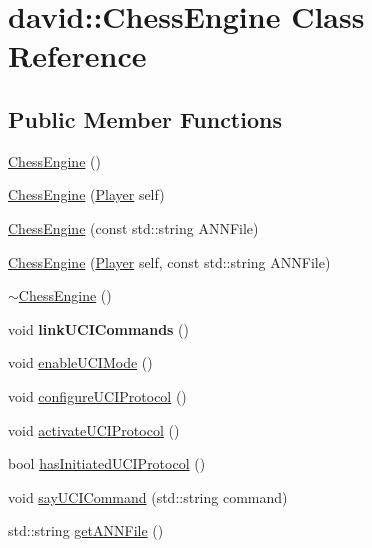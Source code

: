 \hypertarget{classdavid_1_1ChessEngine}{}\section{david\+:\+:Chess\+Engine Class Reference}
\label{classdavid_1_1ChessEngine}
\subsection*{Public Member Functions}
\begin{DoxyCompactItemize}
\item 
\hyperlink{classdavid_1_1ChessEngine_a8207c17987e0e3fca64a71288a3fabfc}{Chess\+Engine} ()
\item 
\hyperlink{classdavid_1_1ChessEngine_a93e1910ba6f2ea91a64027ae404ea47c}{Chess\+Engine} (\hyperlink{structdavid_1_1Player}{Player} self)
\item 
\hyperlink{classdavid_1_1ChessEngine_a850f69799f447605f730eb6edff09a1e}{Chess\+Engine} (const std\+::string A\+N\+N\+File)
\item 
\hyperlink{classdavid_1_1ChessEngine_a17a031eb5b738d0d030addc399eee1be}{Chess\+Engine} (\hyperlink{structdavid_1_1Player}{Player} self, const std\+::string A\+N\+N\+File)
\item 
\hyperlink{classdavid_1_1ChessEngine_a48df80ac4ae29baa7f8bfd50429d4711}{$\sim$\+Chess\+Engine} ()
\item 
\mbox{\label{classdavid_1_1ChessEngine_af0c14184c87a7859e6ebe24d3d635f71}} 
void {\bfseries link\+U\+C\+I\+Commands} ()
\item 
void \hyperlink{classdavid_1_1ChessEngine_a87d97f18682651d669bd978e45c40add}{enable\+U\+C\+I\+Mode} ()
\item 
void \hyperlink{classdavid_1_1ChessEngine_acb677e30d52e8a66f96eaa6954418a9e}{configure\+U\+C\+I\+Protocol} ()
\item 
void \hyperlink{classdavid_1_1ChessEngine_acc39e613bf801c1ac1dfb8e0eee3d025}{activate\+U\+C\+I\+Protocol} ()
\item 
bool \hyperlink{classdavid_1_1ChessEngine_a0783753d3e0678d053d28d509b4170cb}{has\+Initiated\+U\+C\+I\+Protocol} ()
\item 
void \hyperlink{classdavid_1_1ChessEngine_acd362bad7fd99d2210ea2ee9fa92db1a}{say\+U\+C\+I\+Command} (std\+::string command)
\item 
std\+::string \hyperlink{classdavid_1_1ChessEngine_a364e98f32632c0669585ab464f8b6532}{get\+A\+N\+N\+File} ()

\end{DoxyCompactItemize}
